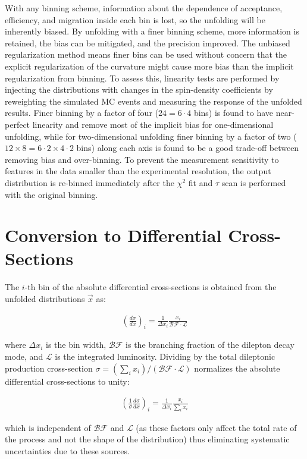With any binning scheme, information about the dependence of acceptance, efficiency, and migration inside each bin is lost, so the unfolding will be inherently biased.
By unfolding with a finer binning scheme, more information is retained, the bias can be mitigated, and the precision improved.
The unbiased regularization method means finer bins can be used without concern that the explicit regularization of the curvature might cause more bias than the implicit regularization from binning.
To assess this, linearity tests are performed by injecting the distributions with changes in the spin-density coefficients by reweighting the simulated MC events and measuring the response of the unfolded results.
Finer binning by a factor of four ($24 = 6 \cdot 4$ bins) is found to have near-perfect linearity and remove most of the implicit bias for one-dimensional unfolding, while for two-dimensional unfolding finer binning by a factor of two ($12 \times 8 = 6 \cdot 2 \times 4 \cdot 2$ bins) along each axis is found to be a good trade-off between removing bias and over-binning.
To prevent the measurement sensitivity to features in the data smaller than the experimental resolution, the output distribution is re-binned immediately after the $\chi^2$ fit and $\tau$ scan is performed with the original binning.

\section{Conversion to Differential Cross-Sections}
The $i$-th bin of the absolute differential cross-sections is obtained from the unfolded distributions $\vec{x}$ as:
\begin{linenomath*}
\begin{align}
\left( \frac{d\sigma}{dx} \right)_i = \frac{1}{\Delta x_i} \frac{x_i}{\mathcal{BF} \cdot \mathcal{L}} 
\end{align}
\end{linenomath*}
where $\Delta x_i$ is the bin width, $\mathcal{BF}$ is the branching fraction of the \ttbar dilepton decay mode, and $\mathcal{L}$ is the integrated luminosity.
Dividing by the total dileptonic \ttbar production cross-section $\sigma =  (\sum_i x_i) / (\mathcal{BF} \cdot \mathcal{L})$ normalizes the absolute differential cross-sections to unity:
\begin{linenomath*}
\begin{align}
\left( \frac{1}{\sigma} \frac{d\sigma}{dx} \right)_i = \frac{1}{\Delta x_i} \frac{x_i}{\sum_i x_i} 
\end{align}
\end{linenomath*}
which is independent of $\mathcal{BF}$ and $\mathcal{L}$ (as these factors only affect the total rate of the process and not the shape of the distribution) thus eliminating systematic uncertainties due to these sources.

